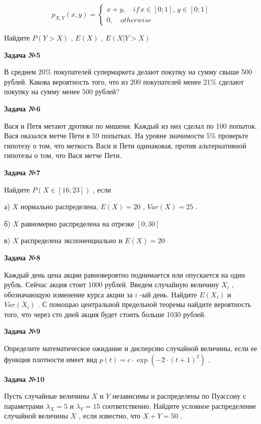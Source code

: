 \documentclass[pdftex,12pt,a4paper]{article}
\begin{document}
$$p_{X,Y} \left(x,y\right)=\left\{\begin{array}{l} {x+y,\quad if\, x\in \left[0;1\right],\, y\in \left[0;1\right]} \\ {0,\quad otherwise} \end{array}\right. $$

Найдите  $P\left(Y>X\right)$ ,  $E\left(X\right)$ ,  $E\left(X|Y>X\right)$ 

{\bf Задача №5}

В среднем 20\% покупателей супермаркета делают покупку на сумму свыше 500 рублей. Какова вероятность того, что из 200 покупателей менее 21\% сделают покупку на сумму менее 500 рублей?

{\bf Задача №}{\bf 6}

Вася и Петя метают дротики по мишени. Каждый из них сделал по 100 попыток. Вася оказался метче Пети в 59 попытках. На уровне значимости 5\% проверьте гипотезу о том, что меткость Васи и Пети одинаковая, против альтернативной гипотезы о том, что Вася метче Пети.

{\bf Задача №7}

Найдите  $P\left(X\in \left[16;23\right]\right)$ , если 

а)  $X$  нормально распределена,  $E\left(X\right)=20$ ,  $Var\left(X\right)=25$ .

б)  $X$  равномерно распределена на отрезке  $\left[0;30\right]$ 

в)  $X$  распределена экспоненциально и  $E\left(X\right)=20$ 

{\bf Задача №8}

Каждый день цена акции равновероятно поднимается или опускается на один рубль. Сейчас акция стоит 1000 рублей. Введем случайную величину  $X_{i} $ , обозначающую изменение курса акции за  $i$ -ый день. Найдите  $E\left(X_{i} \right)$  и  $Var\left(X_{i} \right)$ . С помощью центральной предельной теоремы найдите вероятность того, что через сто дней акция будет стоить больше 1030 рублей.

{\bf Задача №9}

Определите математическое ожидание и дисперсию случайной величины, если ее функция плотности имеет вид  $p\left(t\right)=c\cdot \exp \left(-2\cdot \left(t+1\right)^{2} \right)$ .

{\bf Задача №10}

Пусть случайные величины  $X$  и  $Y$  независимы и распределены по Пуассону с параметрами  $\lambda _{X} =5$  и  $\lambda _{Y} =15$  соответственно. Найдите условное распределение случайной величины  $X$ , если известно, что  $X+Y=50$ .
\end{document}
